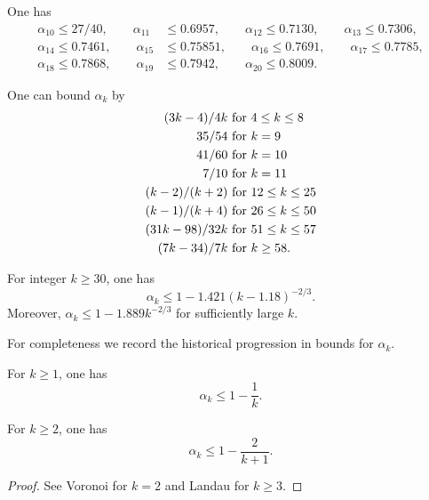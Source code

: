 \begin{theorem}\cite{ivic_ouellet_1989} One has
\begin{align*}
\alpha_{10} \le 27/40,\qquad \alpha_{11} &\le 0.6957,\qquad \alpha_{12} \le 0.7130,\qquad \alpha_{13} \le 0.7306,\\
\alpha_{14} \le 0.7461,\qquad \alpha_{15} &\le 0.75851,\qquad \alpha_{16} \le 0.7691,\qquad \alpha_{17} \le 0.7785,\\
\alpha_{18} \le 0.7868,\qquad \alpha_{19} &\le 0.7942,\qquad \alpha_{20} \le 0.8009.
\end{align*}
\end{theorem}
\begin{theorem}\cite[Theorem 13.12]{ivic}  One can bound $\alpha_k$ by
    \begin{align*}
        (3k-4)/4k & \hbox{ for } 4 \leq k \leq 8 \\
        35/54 & \hbox{ for } k = 9 \\
        41/60 & \hbox{ for } k = 10 \\
        7/10 & \hbox{ for } k = 11 \\
        (k-2)/(k+2) & \hbox{ for } 12 \leq k \leq 25 \\
        (k-1)/(k+4) & \hbox{ for } 26 \leq k \leq 50 \\
        (31k-98)/32k & \hbox{ for } 51 \leq k \leq 57 \\
        (7k-34)/7k & \hbox{ for } k \geq 58.
    \end{align*}
\end{theorem}

\begin{theorem}For integer $k \ge 30$, one has
\[
\alpha_k \leq 1 - 1.421(k - 1.18)^{-2/3}.
\]
Moreover, $\alpha_k \leq 1 - 1.889k^{-2/3}$ for sufficiently large $k$.
\end{theorem}
For completeness we record the historical progression in bounds for $\alpha_k$.
\begin{lemma}For $k \ge 1$, one has
\[
\alpha_k \le 1 - \frac{1}{k}.
\]
\end{lemma}
\begin{lemma}
For $k \ge 2$, one has
\[
\alpha_k \leq 1 - \frac{2}{k + 1}.
\]
\end{lemma}
\begin{proof}
See Voronoi \cite{voronoi_sur_1903} for $k = 2$ and Landau \cite{landau_uber_1912} for $k \ge 3$.
\end{proof}

